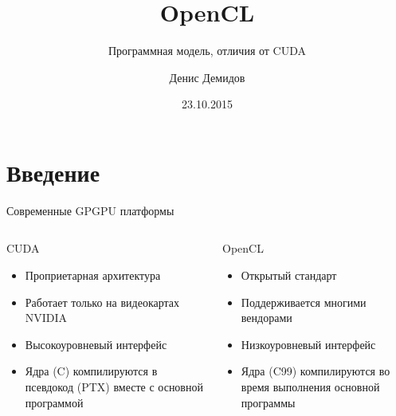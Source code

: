 \documentclass[@BEAMER_OPTIONS@]{beamer}
\title{OpenCL}
\subtitle{Программная модель, отличия от CUDA}
\author{Денис Демидов}
\institute{Институт системных исследований РАН\\
    Казанский Федеральный Университет}
\date{23.10.2015}
\newcommand{\CXX}{{\rm C}\plusplus}
\newcommand{\CC}{{\rm C99}\xspace}
\begin{document}
\begin{frame}{}
    \titlepage
\end{frame}

\note{ }

\section{Введение}

\begin{frame}{Современные GPGPU платформы}
    \begin{columns}
        \begin{column}{0.45\textwidth}
            \begin{block}{CUDA}
                \begin{itemize}
                    \item Проприетарная архитектура
                    \item Работает только на видеокартах NVIDIA
                    \item Высокоуровневый интерфейс
                    \item Ядра (\CXX) компилируются в псевдокод (PTX) вместе с
                        основной программой
                \end{itemize}
            \end{block}
        \end{column}
        \begin{column}{0.45\textwidth}
            \begin{block}{OpenCL}
                \begin{itemize}
                    \item Открытый стандарт
                    \item Поддерживается многими вендорами
                    \item Низкоуровневый интерфейс
                    \item Ядра (\CC) компилируются во время выполнения основной
                        программы
                \end{itemize}
            \end{block}
        \end{column}
    \end{columns}
\end{frame}
\end{document}
